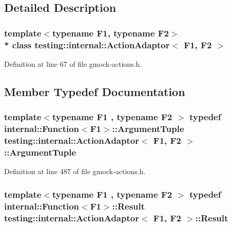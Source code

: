 \subsection{Detailed Description}
\subsubsection*{template$<$typename F1, typename F2$>$\\*
class testing\+::internal\+::\+Action\+Adaptor$<$ F1, F2 $>$}



Definition at line 67 of file gmock-\/actions.\+h.



\subsection{Member Typedef Documentation}
\subsubsection[{\texorpdfstring{Argument\+Tuple}{ArgumentTuple}}]{\setlength{\rightskip}{0pt plus 5cm}template$<$typename F1 , typename F2 $>$ typedef {\bf internal\+::\+Function}$<$F1$>$\+::{\bf Argument\+Tuple} {\bf testing\+::internal\+::\+Action\+Adaptor}$<$ F1, F2 $>$\+::{\bf Argument\+Tuple}}\hypertarget{classtesting_1_1internal_1_1_action_adaptor_a4f78fb73f97b72fea8a93b78a8ab5704}{}\label{classtesting_1_1internal_1_1_action_adaptor_a4f78fb73f97b72fea8a93b78a8ab5704}


Definition at line 487 of file gmock-\/actions.\+h.

\subsubsection[{\texorpdfstring{Result}{Result}}]{\setlength{\rightskip}{0pt plus 5cm}template$<$typename F1 , typename F2 $>$ typedef {\bf internal\+::\+Function}$<$F1$>$\+::{\bf Result} {\bf testing\+::internal\+::\+Action\+Adaptor}$<$ F1, F2 $>$\+::{\bf Result}}\hypertarget{classtesting_1_1internal_1_1_action_adaptor_afa8f7872b6db3d8f1545fd98b45b0b95}{}\label{classtesting_1_1internal_1_1_action_adaptor_afa8f7872b6db3d8f1545fd98b45b0b95}


